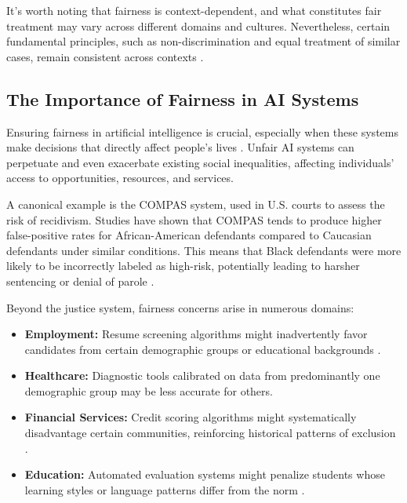 \documentclass[12pt,a4paper,openright,twoside]{book}
\begin{document}
It's worth noting that fairness is context-dependent, and what constitutes fair treatment may vary across different domains and cultures. Nevertheless, certain fundamental principles, such as non-discrimination and equal treatment of similar cases, remain consistent across contexts \cite{kuppler2021distributivejusticefairnessmetrics}.

\subsection{The Importance of Fairness in AI Systems}
Ensuring fairness in artificial intelligence is crucial, especially when these systems make decisions that directly affect people's lives \cite{corbett2023measure, yuan2024ensuringfairnesstransparentauditing}. Unfair AI systems can perpetuate and even exacerbate existing social inequalities, affecting individuals' access to opportunities, resources, and services.

A canonical example is the COMPAS system, used in U.S. courts to assess the risk of recidivism. Studies have shown that COMPAS tends to produce higher false-positive rates for African-American defendants compared to Caucasian defendants under similar conditions. This means that Black defendants were more likely to be incorrectly labeled as high-risk, potentially leading to harsher sentencing or denial of parole \cite{yuan2024ensuringfairnesstransparentauditing}.

Beyond the justice system, fairness concerns arise in numerous domains:

\begin{itemize}
    \item \textbf{Employment:} Resume screening algorithms 
    might inadvertently favor candidates from certain demographic 
    groups or educational backgrounds \cite{kheya2024pursuitfairnessartificialintelligence}.
    \item \textbf{Healthcare:} Diagnostic tools calibrated on data from predominantly one demographic group may be less accurate for others\cite{10749873}.
    \item \textbf{Financial Services:} Credit scoring algorithms might systematically disadvantage certain communities, reinforcing historical patterns of exclusion \cite{Ferrara2023}.
    \item \textbf{Education:} Automated evaluation systems might penalize students whose learning styles or language patterns differ from the norm \cite{kheya2024pursuitfairnessartificialintelligence}.
\end{itemize}
\end{document}

